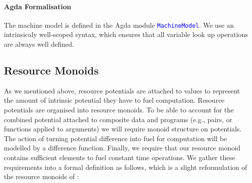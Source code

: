\documentclass[acmsmall,screen]{acmart}
\newcommand{\AgdaModule}[1]{\textcolor{blue}{\tt #1}}
\begin{document}
\paragraph{Agda Formalisation} The machine model is defined in the
Agda module \AgdaModule{MachineModel}. We use an intrinsicaly
well-scoped syntax, which ensures that all variable look up operations
are always well defined.

\subsection{Resource Monoids}
\label{sec:resource-monoids}

As we mentioned above, resource potentials are attached to values to
represent the amount of intrinsic potential they have to fuel
computation. Resource potentials are organised into resource
monoids. To be able to account for the combined potential attached to
composite data and programs (e.g., pairs, or functions applied to
arguments) we will require monoid structure on potentials. The action
of turning potential difference into fuel for computation will be
modelled by a difference function. Finally, we require that our
resource monoid contains sufficient elements to fuel constant time
operations. We gather these requirements into a formal definition as
follows, which is a slight reformulation of the resource monoids of
\citet{dallago11realisability}:
\end{document}
